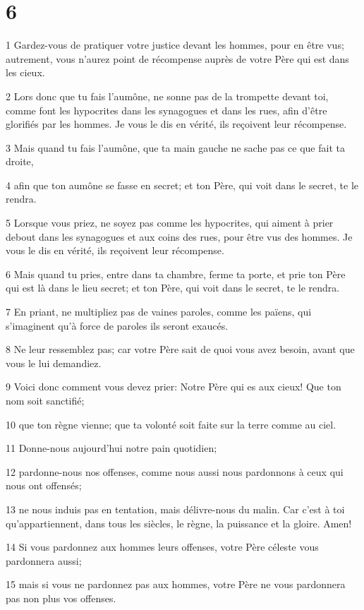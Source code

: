 \chapter{6}

\par 1 Gardez-vous de pratiquer votre justice devant les hommes, pour en être vus; autrement, vous n'aurez point de récompense auprès de votre Père qui est dans les cieux.
\par 2 Lors donc que tu fais l'aumône, ne sonne pas de la trompette devant toi, comme font les hypocrites dans les synagogues et dans les rues, afin d'être glorifiés par les hommes. Je vous le dis en vérité, ils reçoivent leur récompense.
\par 3 Mais quand tu fais l'aumône, que ta main gauche ne sache pas ce que fait ta droite,
\par 4 afin que ton aumône se fasse en secret; et ton Père, qui voit dans le secret, te le rendra.
\par 5 Lorsque vous priez, ne soyez pas comme les hypocrites, qui aiment à prier debout dans les synagogues et aux coins des rues, pour être vus des hommes. Je vous le dis en vérité, ils reçoivent leur récompense.
\par 6 Mais quand tu pries, entre dans ta chambre, ferme ta porte, et prie ton Père qui est là dans le lieu secret; et ton Père, qui voit dans le secret, te le rendra.
\par 7 En priant, ne multipliez pas de vaines paroles, comme les païens, qui s'imaginent qu'à force de paroles ils seront exaucés.
\par 8 Ne leur ressemblez pas; car votre Père sait de quoi vous avez besoin, avant que vous le lui demandiez.
\par 9 Voici donc comment vous devez prier: Notre Père qui es aux cieux! Que ton nom soit sanctifié;
\par 10 que ton règne vienne; que ta volonté soit faite sur la terre comme au ciel.
\par 11 Donne-nous aujourd'hui notre pain quotidien;
\par 12 pardonne-nous nos offenses, comme nous aussi nous pardonnons à ceux qui nous ont offensés;
\par 13 ne nous induis pas en tentation, mais délivre-nous du malin. Car c'est à toi qu'appartiennent, dans tous les siècles, le règne, la puissance et la gloire. Amen!
\par 14 Si vous pardonnez aux hommes leurs offenses, votre Père céleste vous pardonnera aussi;
\par 15 mais si vous ne pardonnez pas aux hommes, votre Père ne vous pardonnera pas non plus vos offenses.
